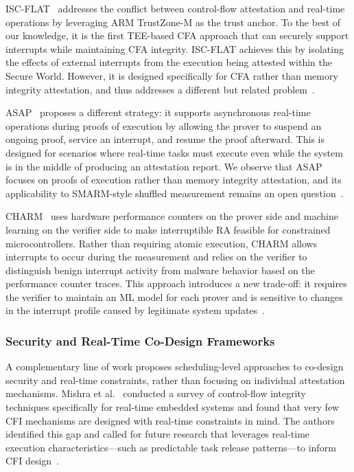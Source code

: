 \documentclass[a4paper,10pt]{article}
\begin{document}
ISC-FLAT~\cite{isc-flat} addresses the conflict between control-flow attestation and real-time operations by leveraging ARM TrustZone-M as the trust anchor. To the best of our knowledge, it is the first TEE-based CFA approach that can securely support interrupts while maintaining CFA integrity. ISC-FLAT achieves this by isolating the effects of external interrupts from the execution being attested within the Secure World. However, it is designed specifically for CFA rather than memory integrity attestation, and thus addresses a different but related problem~\cite{isc-flat}.

ASAP~\cite{asap} proposes a different strategy: it supports asynchronous real-time operations during proofs of execution by allowing the prover to suspend an ongoing proof, service an interrupt, and resume the proof afterward. This is designed for scenarios where real-time tasks must execute even while the system is in the middle of producing an attestation report. We observe that ASAP focuses on proofs of execution rather than memory integrity attestation, and its applicability to SMARM-style shuffled measurement remains an open question~\cite{asap}.

CHARM~\cite{perfcounter-ra} uses hardware performance counters on the prover side and machine learning on the verifier side to make interruptible RA feasible for constrained microcontrollers. Rather than requiring atomic execution, CHARM allows interrupts to occur during the measurement and relies on the verifier to distinguish benign interrupt activity from malware behavior based on the performance counter traces. This approach introduces a new trade-off: it requires the verifier to maintain an ML model for each prover and is sensitive to changes in the interrupt profile caused by legitimate system updates~\cite{perfcounter-ra}.

\subsubsection{Security and Real-Time Co-Design Frameworks}

A complementary line of work proposes scheduling-level approaches to co-design security and real-time constraints, rather than focusing on individual attestation mechanisms. Mishra et al.~\cite{mishra2022survey} conducted a survey of control-flow integrity techniques specifically for real-time embedded systems and found that very few CFI mechanisms are designed with real-time constraints in mind. The authors identified this gap and called for future research that leverages real-time execution characteristics---such as predictable task release patterns---to inform CFI design~\cite{mishra2022survey}.
\end{document}
